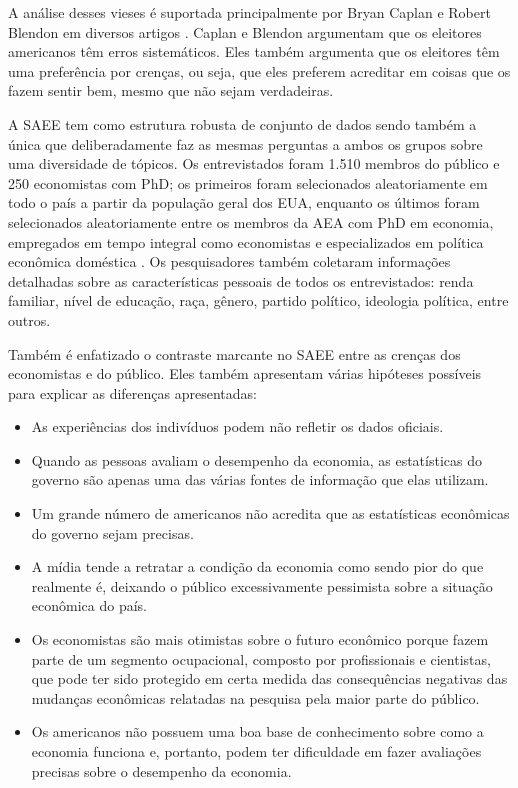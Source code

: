 A análise desses vieses é suportada principalmente por Bryan Caplan e Robert Blendon em diversos artigos \cite{The_Myth_of_the_Rational_Voter,Systematically_Biased_Beliefs_about_Economics,think_like_economists,blendon-gap}. Caplan e Blendon argumentam que os eleitores americanos têm erros sistemáticos. Eles também argumenta que os eleitores têm uma preferência por crenças, ou seja, que eles preferem acreditar em coisas que os fazem sentir bem, mesmo que não sejam verdadeiras.

A SAEE tem como estrutura robusta de conjunto de dados sendo também a única que deliberadamente faz as mesmas perguntas a ambos os grupos sobre uma diversidade de tópicos. Os entrevistados foram 1.510 membros do público e 250 economistas com PhD; os primeiros foram selecionados aleatoriamente em todo o país a partir da população geral dos EUA, enquanto os últimos foram selecionados aleatoriamente entre os membros da AEA com PhD em economia, empregados em tempo integral como economistas e especializados em política econômica doméstica \cite{saee1996,Systematically_Biased_Beliefs_about_Economics,blendon-gap}. Os pesquisadores também coletaram informações detalhadas sobre as características pessoais de todos os entrevistados: renda familiar, nível de educação, raça, gênero, partido político, ideologia política, entre outros. 

Também é enfatizado o contraste marcante no SAEE entre as crenças dos economistas e do público. Eles também apresentam várias hipóteses possíveis para explicar as diferenças apresentadas:

\begin{itemize}
    \item As experiências dos indivíduos podem não refletir os dados oficiais.
    \item Quando as pessoas avaliam o desempenho da economia, as estatísticas do governo são apenas uma das várias fontes de informação que elas utilizam.
    \item Um grande número de americanos não acredita que as estatísticas econômicas do governo sejam precisas.
    \item A mídia tende a retratar a condição da economia como sendo pior do que realmente é, deixando o público excessivamente pessimista sobre a situação econômica do país.
    \item Os economistas são mais otimistas sobre o futuro econômico porque fazem parte de um segmento ocupacional, composto por profissionais e cientistas, que pode ter sido protegido em certa medida das consequências negativas das mudanças econômicas relatadas na pesquisa pela maior parte do público.
    \item Os americanos não possuem uma boa base de conhecimento sobre como a economia funciona e, portanto, podem ter dificuldade em fazer avaliações precisas sobre o desempenho da economia.
\end{itemize}

